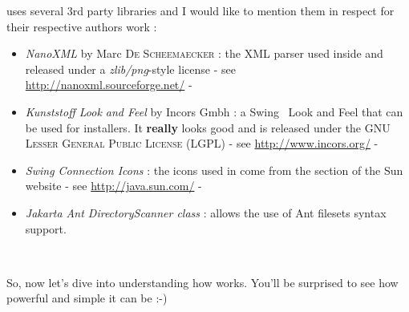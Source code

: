 \IzPack uses several 3rd party libraries and I would like to mention them in
respect for their respective authors work :
\begin{itemize}
	\item \textit{NanoXML} by Marc \textsc{De Scheemaecker} : the XML parser used
	inside \IzPack and released under a \textit{zlib/png}-style license - see\\
	\url{http://nanoxml.sourceforge.net/} -
	\item \textit{Kunststoff Look and Feel} by Incors Gmbh : a Swing\texttrademark 
	\ Look and Feel
	that can be used for installers. It \textbf{really} looks good and
	is released under the \textsc{GNU Lesser General Public License (LGPL)} - see
	\url{http://www.incors.org/} -
	\item \textit{Swing Connection Icons} : the icons used in \IzPack come from
	the \Java section of the Sun website - see \url{http://java.sun.com/} -
	\item \textit{Jakarta Ant DirectoryScanner class} : allows the use of Ant
	filesets syntax support. 
\end{itemize}\

So, now let's dive into understanding how \IzPack works. You'll be
surprised to see how powerful and simple it can be :-)
